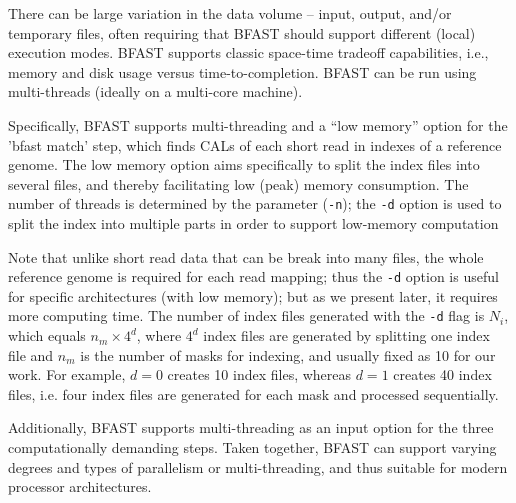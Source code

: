 \documentclass{acm_proc_article-sp}
\begin{document}
There can be large variation in the data volume -- input, output,
and/or temporary files, often requiring that BFAST should support
different (local) execution modes.  BFAST supports classic space-time
tradeoff capabilities, i.e., memory and disk usage versus
time-to-completion. BFAST can be run using multi-threads (ideally
on a multi-core machine).

Specifically, BFAST supports multi-threading and a ``low memory''
option for the 'bfast match' step, which finds CALs of each short read in
indexes of a reference genome.  The low memory option aims specifically to
split the index files into several files, and thereby facilitating low
(peak) memory consumption.  The number of threads is determined by the
parameter (\texttt{-n}); the \texttt{-d} option is used to split the
index into multiple parts in order to support low-memory computation


Note that unlike short read data that can be break into many files, the whole reference genome is required for each read mapping;
thus the \texttt{-d} option is useful for specific architectures (with
low memory); but as we present later, it requires more computing time.  The number of index files
generated with the \texttt{-d} flag is $N_i$, which equals $n_m \times
4^d$, where $4^d$ index files are generated by splitting one index file and
$n_m$ is the number of masks for indexing, and usually fixed as 10 for
our work.  For example, $d=0$ creates 10 index files, whereas $d=1$
creates 40 index files, i.e. four index files are generated for each mask
and processed sequentially.  

Additionally, BFAST supports multi-threading as an input option for
the three computationally demanding steps.  Taken together, BFAST can
support varying degrees and types of parallelism or multi-threading,
and thus suitable for modern processor architectures.
\end{document}
